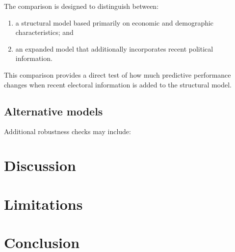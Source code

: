 \documentclass[12pt]{article}
\begin{document}
	The comparison is designed to distinguish between:
	
	\begin{enumerate}
		\item a structural model based primarily on economic and
		demographic characteristics; and
		
		\item an expanded model that additionally incorporates recent
		political information.
	\end{enumerate}
	
	This comparison provides a direct test of how much predictive
	performance changes when recent electoral information is added to the
	structural model.
	
	
	\subsection{Alternative models}
	
	Additional robustness checks may include:
	
	
	
	\section{Discussion}
	
	
	
	
	\section{Limitations}
	
	
	
	
	
	\section{Conclusion}
	
	
	
	
	
	
	
	
\end{document}

